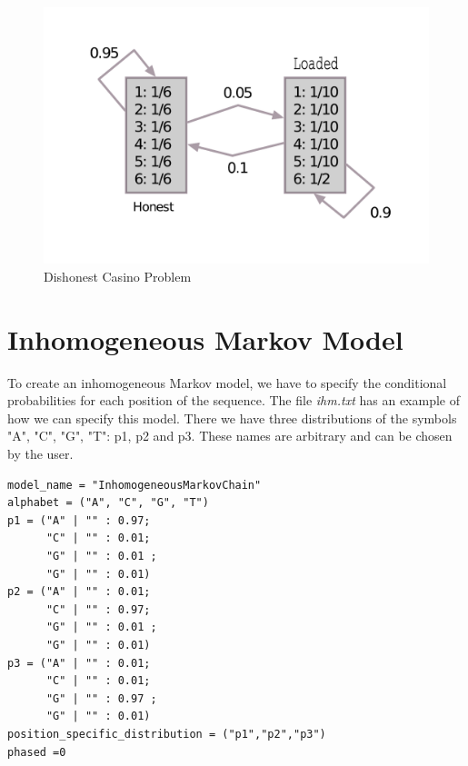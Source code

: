 \begin{figure}[!h]
  \centering
  \includegraphics[scale=0.5]{fig_cassino} 
  \caption{Dishonest Casino Problem}
  \label{fig:hmm-casino}
\end{figure}

\section{Inhomogeneous Markov Model}

To create an inhomogeneous Markov model, we have to specify the conditional probabilities for each position of the sequence. The file \textit{ihm.txt} has  an example of how we can specify this model. There we have three distributions of the symbols "A", "C", "G", "T": p1, p2 and p3.  These names are arbitrary and can be chosen by the user.

\vspace{1em}
\begin{minipage}{\textwidth}
\begin{Verbatim}[frame=single,  label={ihm.txt}]
model_name = "InhomogeneousMarkovChain"
alphabet = ("A", "C", "G", "T")
p1 = ("A" | "" : 0.97;
      "C" | "" : 0.01;
      "G" | "" : 0.01 ;
      "G" | "" : 0.01)
p2 = ("A" | "" : 0.01;
      "C" | "" : 0.97;
      "G" | "" : 0.01 ;
      "G" | "" : 0.01)
p3 = ("A" | "" : 0.01;
      "C" | "" : 0.01;
      "G" | "" : 0.97 ;
      "G" | "" : 0.01)
position_specific_distribution = ("p1","p2","p3")
phased =0
\end{Verbatim}
\end{minipage}
\vspace{1em}

